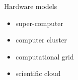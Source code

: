 {
\begin{frame}

	\begin{columns}
	\begin{block}{Hardware models}
	\begin{overlayarea}{\textwidth}{4cm}
		\begin{itemize}
			\item<1->{super-computer}
			\item<2->{computer cluster}
			\item<3->{computational grid}
			\item<4->{scientific cloud}
		\end{itemize}
		\vspace{5cm}
	\end{overlayarea}
	\end{block}


\end{columns}
\end{frame}}
